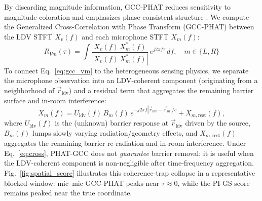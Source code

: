 \documentclass{Interspeech}
\begin{document}
By discarding magnitude information, GCC-PHAT reduces sensitivity to magnitude coloration and emphasizes phase-consistent structure \cite{yamada2023speech}. We compute the Generalized Cross-Correlation with Phase Transform (GCC-PHAT) \cite{knapp1976gcc} between the LDV STFT $X_v(f)$ and each microphone STFT $X_m(f)$:
%
\begin{equation}
  R_{Vm}(\tau) = \int \frac{X_v(f)\,X_m^*(f)}{\left|X_v(f)\,X_m^*(f)\right|}\,e^{j2\pi f\tau}\,df, \quad m \in \{L, R\}
  \label{eq:gcc_vm}
\end{equation}
%
To connect Eq.~\ref{eq:gcc_vm} to the heterogeneous sensing physics, we separate the microphone observation into an LDV-coherent component (originating from a neighborhood of $\vec{r}_{\text{ldv}}$) and a residual term that aggregates the remaining barrier surface and in-room interference:
%
\begin{equation}
  X_m(f) = U_{\text{ldv}}(f)\,B_m(f)\,e^{-j 2\pi f |\vec{r}_{\text{ldv}} - \vec{r}_m|/c} + X_{m,\text{rest}}(f),
  \label{eq:cross}
\end{equation}
%
where $U_{\text{ldv}}(f)$ is the (unknown) barrier response at $\vec{r}_{\text{ldv}}$ driven by the source, $B_m(f)$ lumps slowly varying radiation/geometry effects, and $X_{m,\text{rest}}(f)$ aggregates the remaining barrier re-radiation and in-room interference. Under Eq.~\ref{eq:cross}, PHAT-GCC does not \emph{guarantee} barrier removal; it is useful when the LDV-coherent component is non-negligible after time-frequency aggregation. Fig.~\ref{fig:spatial_score} illustrates this coherence-trap collapse in a representative blocked window: mic--mic GCC-PHAT peaks near $\tau \approx 0$, while the PI-GS score remains peaked near the true coordinate.
\end{document}
